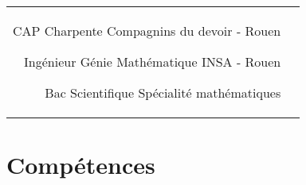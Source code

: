 \documentclass[10pt]{article} %
\begin{document}
\begin{paracol}{2}

  \begin{supertabular}{rl} %


    {CAP Charpente} %
    {} %
    {} %
    {Compagnins du devoir - Rouen} %


    {Ingénieur Génie Mathématique} %
    {} %
    {} %
    {INSA - Rouen} %


    {Bac Scientifique} %
    {} %
    {} %
    {Spécialité mathématiques} %


  \end{supertabular}


  \section{Compétences}





  \begin{supertabular}{rl} %


\end{supertabular}
\end{paracol}
\end{document}
